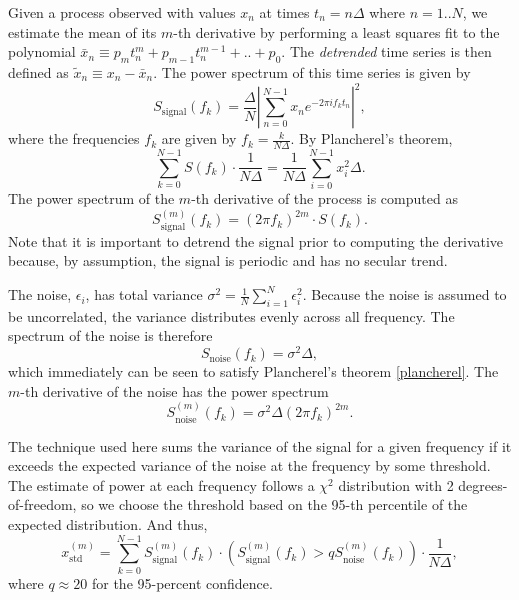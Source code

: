 \documentclass{ametsoc}
\begin{document}
Given a process observed with values $x_n$ at times $t_n = n \Delta$ where $n=1..N$, we estimate the mean of its $m$-th derivative by performing a least squares fit to the polynomial $\bar{x}_n \equiv p_m t_n^m + p_{m-1} t_n^{m-1} + .. + p_0$. The \emph{detrended} time series is then defined as $\tilde{x}_n \equiv x_n - \bar{x}_n$. The power spectrum of this time series is given by
\begin{equation}
S_{\textrm{signal}}(f_k) = \frac{\Delta}{N} \left\lvert \sum_{n=0}^{N-1} x_n e^{-2\pi i f_k t_n} \right\rvert^2,
\end{equation}
where the frequencies $f_k$ are given by $f_k = \frac{k}{N\Delta}$. %
By Plancherel's theorem,
\begin{equation}
\label{plancherel}
\sum_{k=0}^{N-1} S(f_k) \cdot \frac{1}{N \Delta} = \frac{1}{N \Delta} \sum_{i=0}^{N-1} x_i^2 \Delta.
\end{equation}
The power spectrum of the $m$-th derivative of the process is computed as
\begin{equation}
S_{\textrm{signal}}^{(m)}(f_k) = (2 \pi f_k)^{2m} \cdot S(f_k).
\end{equation}
Note that it is important to detrend the signal prior to computing the derivative because, by assumption, the signal is periodic and has no secular trend.

The noise, $\epsilon_i$, has total variance $\sigma^2 = \frac{1}{N} \sum_{i=1}^{N} \epsilon_i^2$. Because the noise is assumed to be uncorrelated, the variance distributes evenly across all frequency. The spectrum of the noise is therefore
\begin{equation}
S_{\textrm{noise}}(f_k) = \sigma^2 \Delta,
\end{equation}
which immediately can be seen to satisfy Plancherel's theorem \eqref{plancherel}. The $m$-th derivative of the noise has the power spectrum
\begin{equation}
S_{\textrm{noise}}^{(m)}(f_k) = \sigma^2 \Delta (2 \pi f_k)^{2m}.
\end{equation}

The technique used here sums the variance of the signal for a given frequency if it exceeds the expected variance of the noise at the frequency by some threshold. The estimate of power at each frequency follows a $\chi^2$ distribution with 2 degrees-of-freedom, so we choose the threshold based on the 95-th percentile of the expected distribution. And thus,
\begin{equation}
x^{(m)}_{\textrm{std}} = \sum_{k=0}^{N-1} S^{(m)}_{\textrm{signal}}(f_k) \cdot \left( S^{(m)}_{\textrm{signal}}(f_k) > q S_{\textrm{noise}}^{(m)}(f_k) \right) \cdot \frac{1}{N \Delta},
\end{equation}
where $q\approx 20$ for the 95-percent confidence.




\end{document}
